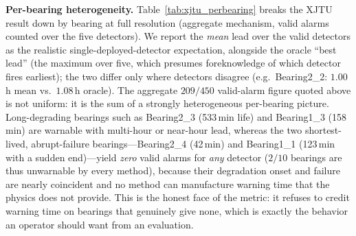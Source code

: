 \documentclass[journal]{IEEEtran}
\begin{document}
\textbf{Per-bearing heterogeneity.} Table~\ref{tab:xjtu_perbearing} breaks the
XJTU result down by bearing at full resolution (aggregate mechanism, valid
alarms counted over the five detectors). We report the \emph{mean} lead over the
valid detectors as the realistic single-deployed-detector expectation, alongside
the oracle ``best lead'' (the maximum over five, which presumes foreknowledge of
which detector fires earliest); the two differ only where detectors disagree
(e.g.\ Bearing2\_2: $1.00$\,h mean vs.\ $1.08$\,h oracle). The aggregate $209/450$
valid-alarm figure quoted above is not uniform: it is the sum of a strongly
heterogeneous per-bearing picture. Long-degrading bearings such as Bearing2\_3
(533\,min life) and Bearing1\_3 (158\,min) are warnable with multi-hour or
near-hour lead, whereas the two shortest-lived, abrupt-failure
bearings---Bearing2\_4 (42\,min) and Bearing1\_1 (123\,min with a sudden
end)---yield \emph{zero} valid alarms for \emph{any} detector ($2/10$ bearings are
thus unwarnable by every method), because their degradation onset and failure are
nearly coincident and no method can manufacture warning time that the physics does
not provide. This is the honest face of the metric: it refuses to credit warning
time on bearings that genuinely give none, which is exactly the behavior an
operator should want from an evaluation.
\end{document}
